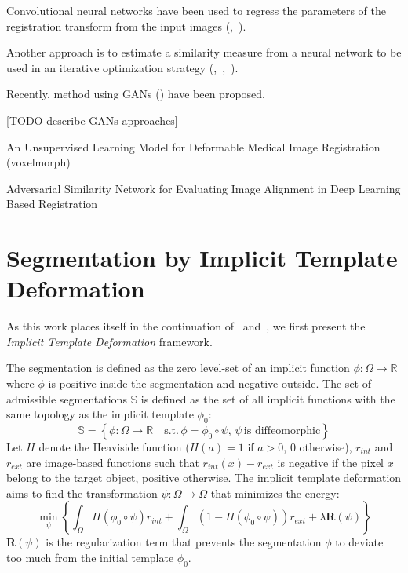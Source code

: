 Convolutional neural networks have been used to regress the parameters of the registration transform from the input images (\textcite{miao2016},~\textcite{yang2016}).

Another approach is to estimate a similarity measure from a neural network to be used in an iterative optimization strategy (\textcite{wu2013MICCAI},~\textcite{cheng2015},~\textcite{simonovosky2016MICCAI}).

Recently, method using GANs (\textcite{goodfellow2014}) have been proposed.  

[TODO describe GANs approaches]

An Unsupervised Learning Model for Deformable Medical Image Registration (voxelmorph)

Adversarial Similarity Network for Evaluating Image Alignment in Deep Learning Based Registration

\section{Segmentation by Implicit Template Deformation}

As this work places itself in the continuation of~\textcite{mory2012MICCAI} and~\textcite{prevost2013PHD}, we first present the \textit{Implicit Template Deformation} framework. 

The segmentation is defined as the zero level-set of an implicit function $\phi : \Omega \rightarrow \mathbb{R}$ where $\phi$ is positive inside the segmentation and negative outside. The set of admissible segmentations $\mathbb{S}$ is defined as the set of all implicit functions with the same topology as the implicit template $\phi_0$:
\begin{equation}
    \mathbb{S} = \left\{ \phi : \Omega \rightarrow \mathbb{R}\quad \text{s.t.}\, \phi = \phi_0 \circ \psi, \, \psi \, \text{is diffeomorphic} \right\}
\end{equation}
Let $H$ denote the Heaviside function ($H(a) = 1$ if $a > 0$, $0$ otherwise), $r_{int}$ and $r_{ext}$ are image-based functions such that $r_{int}(x) - r_{ext}$ is negative if the pixel $x$ belong to the target object, positive otherwise. The implicit template deformation aims to find the transformation $\psi : \Omega \rightarrow \Omega$ that minimizes the energy:
\begin{equation}
    \min_{\psi} \left\{ \int_{\Omega} H \left( \phi_0 \circ \psi \right) r_{int} + \int_{\Omega} \left( 1 - H \left( \phi_0 \circ \psi \right) \right) r_{ext} + \lambda \mathbf{R} \left( \psi \right) \right\}
\end{equation}
$\mathbf{R} \left( \psi \right)$ is the regularization term that prevents the segmentation $\phi$ to deviate too much from the initial template $\phi_0$.

